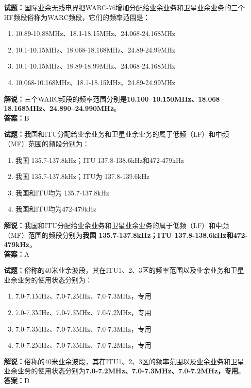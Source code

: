 \documentclass{ctexbook}
\begin{document}
\bigskip

\noindent\textbf{试题：}国际业余无线电界把WARC-76增加分配给业余业务和卫星业余业务的三个HF频段俗称为WARC频段，它们的频率范围是：
\begin{enumerate}[leftmargin=3em]
  \item 10.89-10.88\unit{\MHz}、18.1-18.15\unit{\MHz}、24.068-24.168\unit{\MHz}
  \item 10.1-10.15\unit{\MHz}、18.068-18.168\unit{\MHz}、24.89-24.99\unit{\MHz}
  \item 10.1-10.15\unit{\MHz}、18.89-18.99\unit{\MHz}、24.068-24.168\unit{\MHz}
  \item 10.068-10.168\unit{\MHz}、18.1-18.15\unit{\MHz}、24.89-24.99\unit{\MHz}
\end{enumerate}
\noindent\textbf{解说：}三个WARC频段的频率范围分别是\textbf{10.100–10.150\unit{\MHz}、18.068–18.168\unit{\MHz}、24.890–24.990\unit{\MHz}}。\\\noindent\textbf{答案：}B

\bigskip

\noindent\textbf{试题：}我国和ITU分配给业余业务和卫星业余业务的属于低频（LF）和中频（MF）范围的频段分别为：
\begin{enumerate}[leftmargin=3em]
  \item 我国 135.7-137.8\unit{\kHz}；ITU 137.8-138.6\unit{\kHz}和472-479\unit{\kHz}
  \item 我国 135.7-137.8\unit{\kHz}；ITU为 137.8-139.6\unit{\kHz}
  \item 我国和ITU均为 135.7-137.8\unit{\kHz}
  \item 我国和ITU均为472-479\unit{\kHz}
\end{enumerate}
\noindent\textbf{解说：}我国和ITU分配给业余业务和卫星业余业务的属于低频（LF）和中频（MF）范围的频段分别为\textbf{我国 135.7-137.8\unit{\kHz}；ITU 137.8-138.6\unit{\kHz}和472-479\unit{\kHz}}。\\\noindent\textbf{答案：}A

\bigskip

\noindent\textbf{试题：}俗称的40米业余波段，其在ITU1、2、3区的频率范围以及业余业务和卫星业余业务的使用状态分别为：
\begin{enumerate}[leftmargin=3em]
  \item 7.0-7.1\unit{\MHz}、7.0-7.2\unit{\MHz}、7.0-7.3\unit{\MHz}，专用
  \item 7.0-7.3\unit{\MHz}、7.0-7.3\unit{\MHz}、7.0-7.2\unit{\MHz}，专用
  \item 7.0-7.3\unit{\MHz}、7.0-7.3\unit{\MHz}、7.0-7.3\unit{\MHz}，专用
  \item 7.0-7.2\unit{\MHz}、7.0-7.3\unit{\MHz}、7.0-7.2\unit{\MHz}，专用
\end{enumerate}
\noindent\textbf{解说：}俗称的40米业余波段，其在ITU1、2、3区的频率范围以及业余业务和卫星业余业务的使用状态分别为\textbf{7.0-7.2\unit{\MHz}、7.0-7.3\unit{\MHz}、7.0-7.2\unit{\MHz}，专用}。\\\noindent\textbf{答案：}D
\end{document}
